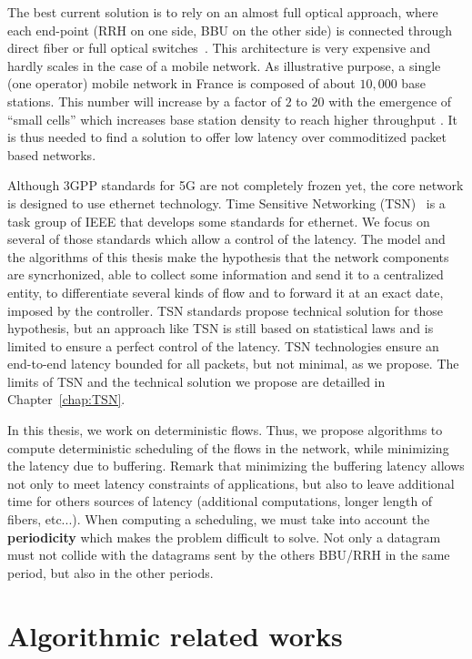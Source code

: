 The best current solution is to rely on an almost full optical approach, where each end-point (RRH on one side, BBU on the other side) is connected through direct fiber or full optical switches~\cite{pizzinat2015things,tayq2017real}. This architecture is very expensive and hardly scales in the case of a mobile network. As illustrative purpose, a single (one operator) mobile network in France is composed of about $10,000$ base stations. This number will increase by a factor of $2$ to $20$ with the emergence of “small cells” which increases base station density to reach higher throughput \cite{leclerc2016transmission,leclerc2016signaling}. It is thus needed to find a solution to offer low latency over commoditized packet based networks. 

Although 3GPP standards for 5G are not completely frozen yet, the core network is designed to use ethernet technology. Time Sensitive Networking (TSN)~\cite{ieee802,ieeep802} is a task group of IEEE that develops some standards for ethernet. We focus on several of those standards which allow a control of the latency.
 The model and the algorithms of this thesis make the hypothesis that the network components are syncrhonized, able to collect some information and send it to a centralized entity, to differentiate several kinds of flow and to forward it at an exact date, imposed by the controller. TSN standards propose technical solution for those hypothesis, but an approach like TSN is still based on statistical laws and is limited to ensure a perfect control of the latency. TSN technologies ensure an end-to-end latency bounded for all packets, but not minimal, as we propose. The limits of TSN and the technical solution we propose are detailled in Chapter~\ref{chap:TSN}.

 In this thesis, we work on deterministic flows. Thus, we propose algorithms to compute deterministic scheduling of the flows in the network, while minimizing the latency due to buffering. Remark that minimizing the buffering latency allows not only to meet latency constraints of applications, but also to leave additional time for others sources of latency (additional computations, longer length of fibers, etc...). When computing a scheduling, we must take into account the \textbf{periodicity} which makes the problem difficult to solve. Not only a datagram must not collide with the datagrams sent by the others BBU/RRH in the same period, but also in the other periods.



\section{Algorithmic related works}
 
